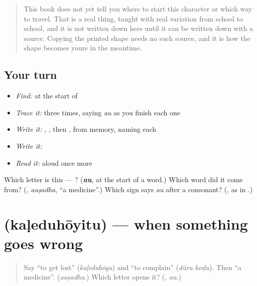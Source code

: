 \begin{quote}
This book does not yet tell you where to start this character or which way to travel. That is a real thing, taught with real variation from school to school, and it is not written down here until it can be written down with a source. Copying the printed shape needs no such source, and it is how the shape becomes yours in the meantime.
\end{quote}

\subsection*{Your turn}
\begin{itemize}
\raggedright
  \item \emph{Find:}  at the start of \textbf{}
  \item \emph{Trace it:}  three times, saying \emph{au} as you finish each one
  \item \emph{Write it:} , , then , from memory, naming each
  \item \emph{Write it:} \textbf{}
  \item \emph{Read it:} \textbf{} aloud once more
\end{itemize}

\begin{tcolorbox}[breakable,colback=teal!4,colframe=teal!35!black,title={Before you move on}]
Which letter is this — ? (\emph{\textbf{au}}, at the start of a word.) Which word did it come from? (\textbf{}, \emph{auṣadha}, \textquotedblleft{}a medicine\textquotedblright{}.) Which sign says \emph{au} after a consonant? (\textbf{}, as in \textbf{}.)
\end{tcolorbox}
\section[\texorpdfstring{\kn{ಕಳೆದುಹೋಯಿತು} (kaḷeduhōyitu)}{ಕಳೆದುಹೋಯಿತು (kaḷeduhōyitu)}]{ (kaḷeduhōyitu) — when something goes wrong}

\label{lesson:KA-C314-kaleduhoyitu}



\begin{quote}
Say \textquotedblleft{}to get lost\textquotedblright{} (\emph{kaḷeduhōgu}) and \textquotedblleft{}to complain\textquotedblright{} (\emph{dūru koḍu}). Then \textquotedblleft{}a medicine\textquotedblright{}. (\emph{auṣadha}.) Which letter opens it? (\textbf{}, \emph{au}.)
\end{quote}

